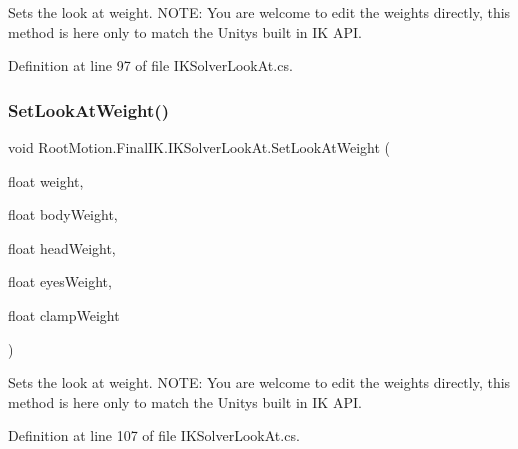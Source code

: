 Sets the look at weight. N\+O\+TE\+: You are welcome to edit the weights directly, this method is here only to match the Unity\textquotesingle{}s built in IK A\+PI. 



Definition at line 97 of file I\+K\+Solver\+Look\+At.\+cs.

\mbox{\label{class_root_motion_1_1_final_i_k_1_1_i_k_solver_look_at_a43a0e0d404ef087e0fe097d8cd0f85b1}} 
\subsubsection{\texorpdfstring{Set\+Look\+At\+Weight()}{SetLookAtWeight()}\hspace{0.1cm}{\footnotesize\ttfamily [5/6]}}
{\footnotesize\ttfamily void Root\+Motion.\+Final\+I\+K.\+I\+K\+Solver\+Look\+At.\+Set\+Look\+At\+Weight (\begin{DoxyParamCaption}\item[{float}]{weight,  }\item[{float}]{body\+Weight,  }\item[{float}]{head\+Weight,  }\item[{float}]{eyes\+Weight,  }\item[{float}]{clamp\+Weight }\end{DoxyParamCaption})}



Sets the look at weight. N\+O\+TE\+: You are welcome to edit the weights directly, this method is here only to match the Unity\textquotesingle{}s built in IK A\+PI. 



Definition at line 107 of file I\+K\+Solver\+Look\+At.\+cs.

\mbox{\label{class_root_motion_1_1_final_i_k_1_1_i_k_solver_look_at_a2521620b0f75ed1e01dafccf6db2d1b2}} 
